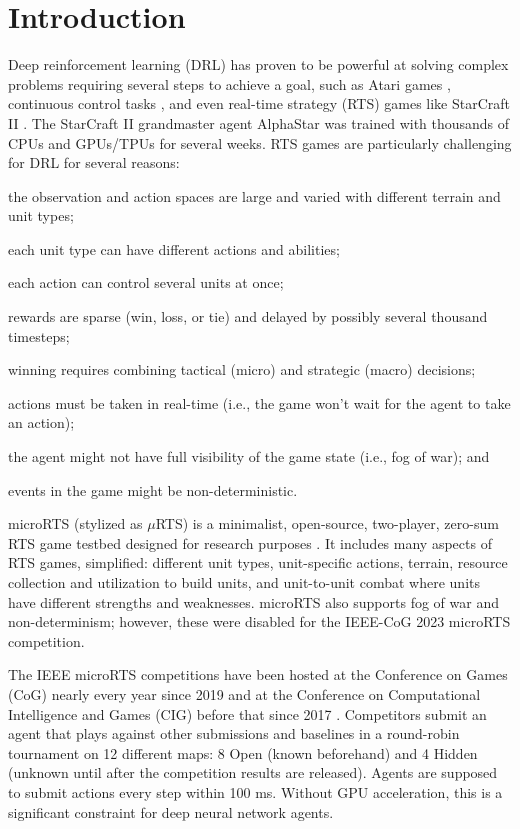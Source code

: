 \documentclass[conference]{IEEEtran}
\begin{document}
\section{Introduction}
Deep reinforcement learning (DRL) has proven to be powerful at solving complex
problems requiring several steps to achieve a goal, such as Atari games \cite{DBLP:journals/corr/MnihKSGAWR13}, continuous
control tasks \cite{DBLP:journals/corr/LillicrapHPHETS15}, and even real-time strategy
(RTS) games like StarCraft II \cite{Vinyals2019GrandmasterLI}. The StarCraft II
grandmaster agent AlphaStar was trained with thousands of
CPUs and GPUs/TPUs for several weeks. RTS games are particularly challenging for DRL for
several reasons:
\begin{inparaenum}[(1)]
    \item the observation and action spaces are large and varied with different terrain and
        unit types;
    \item each unit type can have different actions and abilities;
    \item each action can control several units at once;
    \item rewards are sparse (win, loss, or tie) and delayed by possibly several
    thousand timesteps;
    \item winning requires combining tactical (micro) and strategic (macro) decisions;
    \item actions must be taken in real-time (i.e., the game won't wait for the agent to
        take an action);
    \item the agent might not have full visibility of the game state (i.e., fog of war); and
    \item events in the game might be non-deterministic.
\end{inparaenum}

microRTS (stylized as $\mu$RTS) is a minimalist, open-source, two-player, zero-sum RTS game testbed designed for research
purposes \cite{DBLP:conf/aiide/Ontanon13}. It includes many aspects of RTS games, simplified: different unit types, unit-specific
actions, terrain, resource collection and utilization to build units, and unit-to-unit combat
where units have different strengths and weaknesses. microRTS also supports fog of war
and non-determinism; however, these were disabled for the IEEE-CoG 2023 microRTS
competition.

The IEEE microRTS competitions have been hosted at the Conference on Games (CoG) nearly
every year since 2019 and at the Conference on Computational Intelligence and Games
(CIG) before that since 2017 \cite{Ontañón_Barriga_Silva_Moraes_Lelis_2018}.
Competitors submit an agent that plays against other submissions and baselines in a round-robin tournament
on 12 different maps: 8 Open (known beforehand) and 4 Hidden (unknown until after the
competition results are released). Agents are supposed
to submit actions every step within 100 ms. Without GPU acceleration, this is a significant constraint for deep neural
network agents.
\end{document}

